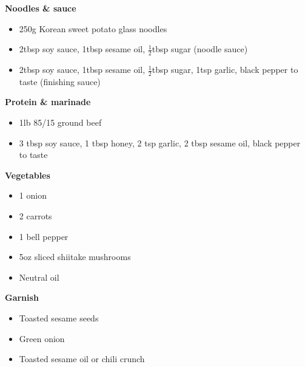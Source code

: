 \begin{minipage}[t]{0.49\linewidth}\par{}\end{minipage}\hfill
\begin{minipage}[t]{0.49\linewidth}\par{}\end{minipage}
\vspace{6pt}
\begin{minipage}[t]{0.60\linewidth}
\textbf{Noodles \& sauce}
\begin{itemize}
\item 250g Korean sweet potato glass noodles
\item 2tbsp soy sauce, 1tbsp sesame oil, \(\frac12\)tbsp sugar (noodle sauce)
\item 2tbsp soy sauce, 1tbsp sesame oil, \(\frac12\)tbsp sugar, 1tsp garlic, black pepper to taste (finishing sauce)
\end{itemize}
\textbf{Protein \& marinade}
\begin{itemize}
\item 1lb 85/15 ground beef
\item 3 tbsp soy sauce, 1 tbsp honey, 2 tsp garlic, 2 tbsp sesame oil, black pepper to taste
\end{itemize}
\textbf{Vegetables}
\begin{itemize}
\item 1 onion
\item 2 carrots
\item 1 bell pepper
\item 5oz sliced shiitake mushrooms
\item Neutral oil
\end{itemize}
\textbf{Garnish}
\begin{itemize}
\item Toasted sesame seeds
\item Green onion
\item Toasted sesame oil or chili crunch
\end{itemize}
\end{minipage}\hfill
